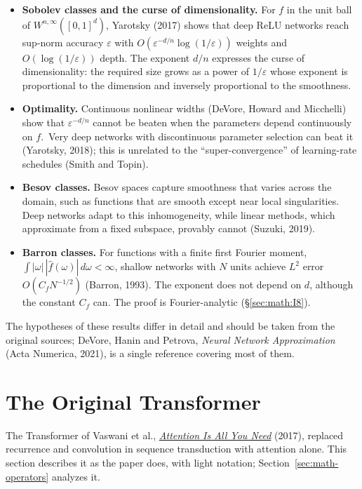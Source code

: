\begin{itemize}
\tightlist
\item
  \textbf{Sobolev classes and the curse of dimensionality.} For \(f\) in the
  unit ball of \(W^{n,\infty}([0,1]^d)\), Yarotsky (2017)
  shows that deep ReLU networks reach sup-norm accuracy \(\varepsilon\) with
  \(O(\varepsilon^{-d/n} \log(1/\varepsilon))\) weights and \(O(\log(1/\varepsilon))\) depth. The exponent
  \(d/n\) expresses the curse of dimensionality: the required size grows as
  a power of \(1/\varepsilon\) whose exponent is proportional to the dimension and
  inversely proportional to the smoothness.
\item
  \textbf{Optimality.} Continuous nonlinear widths (DeVore, Howard and
  Micchelli) show that \(\varepsilon^{-d/n}\) cannot be beaten when the parameters
  depend continuously on \(f\).~Very deep networks with discontinuous
  parameter selection can beat it (Yarotsky, 2018); this is unrelated to
  the ``super-convergence'' of learning-rate schedules (Smith and Topin).
\item
  \textbf{Besov classes.} Besov spaces capture smoothness that varies
  across the domain, such as functions that are smooth except near local
  singularities. Deep networks adapt to this inhomogeneity, while linear
  methods, which approximate from a fixed subspace, provably cannot
  (Suzuki, 2019).
\item
  \textbf{Barron classes.} For functions with a finite first Fourier
  moment, \(\int |\omega|\, |\hat{f}(\omega)|\, d\omega <
  \infty\), shallow networks with \(N\) units achieve \(L^{2}\) error
  \(O(C_f N^{-1/2})\) (Barron, 1993). The exponent does not depend on \(d\),
  although the constant \(C_f\) can. The proof is
  Fourier-analytic (\S\ref{sec:math:I8}).
\end{itemize}

The hypotheses of these results differ in detail and should be taken
from the original sources; DeVore, Hanin and Petrova, \emph{Neural
Network Approximation} (Acta Numerica, 2021), is a single reference
covering most of them.

\section{The Original Transformer}\label{sec:math-original}

The Transformer of Vaswani et al.,
\emph{\href{https://arxiv.org/abs/1706.03762}{Attention Is All You
Need}} (2017), replaced recurrence and convolution in sequence
transduction with attention alone. This section describes it as the paper
does, with light notation; Section~\ref{sec:math-operators} analyzes it.

